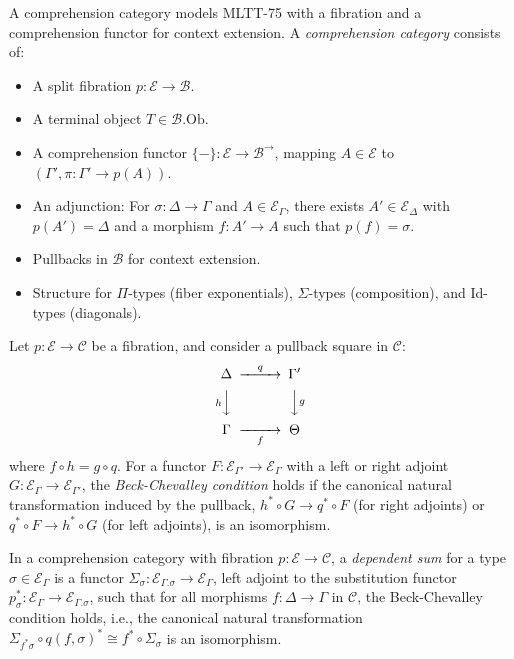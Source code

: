 \documentclass{article}
\begin{document}
\begin{definition}
A comprehension category models MLTT-75 with a fibration and a comprehension functor for context extension.
A \emph{comprehension category} consists of:
\begin{itemize}
  \item A split fibration $p : \mathcal{E} \to \mathcal{B}$.
  \item A terminal object $T \in \mathcal{B}.\text{Ob}$.
  \item A comprehension functor $\{-\} : \mathcal{E} \to \mathcal{B}^\to$, mapping $A \in \mathcal{E}$ to $(\Gamma', \pi : \Gamma' \to p(A))$.
  \item An adjunction: For $\sigma : \Delta \to \Gamma$ and $A \in \mathcal{E}_\Gamma$, there exists $A' \in \mathcal{E}_\Delta$ with $p(A') = \Delta$ and a morphism $f : A' \to A$ such that $p(f) = \sigma$.
  \item Pullbacks in $\mathcal{B}$ for context extension.
  \item Structure for $\Pi$-types (fiber exponentials), $\Sigma$-types (composition), and Id-types (diagonals).
\end{itemize}
\end{definition}

\begin{definition}
Let \(p : \mathcal{E} \to \mathcal{C}\) be a fibration, and consider a pullback square in \(\mathcal{C}\):
\[
\begin{CD}
\Delta @>q>> \Gamma' \\
@V h VV @VV g V \\
\Gamma @>>f> \Theta
\end{CD}
\]
where \(f \circ h = g \circ q\). For a functor \(F : \mathcal{E}_{\Gamma'} \to \mathcal{E}_\Gamma\) with a left or right adjoint \(G : \mathcal{E}_\Gamma \to \mathcal{E}_{\Gamma'}\), the \emph{Beck-Chevalley condition} holds if the canonical natural transformation induced by the pullback, \(h^* \circ G \to q^* \circ F\) (for right adjoints) or \(q^* \circ F \to h^* \circ G\) (for left adjoints), is an isomorphism.
\end{definition}

\newpage



\begin{definition}
In a comprehension category with
fibration \(p : \mathcal{E} \to \mathcal{C}\), a \emph{dependent sum} for
a type \(\sigma \in \mathcal{E}_\Gamma\) is
a functor \(\Sigma_\sigma : \mathcal{E}_{\Gamma.\sigma} \to \mathcal{E}_\Gamma\),
left adjoint to the substitution functor
\(p_\sigma^* : \mathcal{E}_\Gamma \to \mathcal{E}_{\Gamma.\sigma}\), such that for all morphisms \(f : \Delta \to \Gamma\) in \(\mathcal{C}\), the Beck-Chevalley condition holds, i.e., the canonical natural transformation \(\Sigma_{f^*\sigma} \circ q(f, \sigma)^* \cong f^* \circ \Sigma_\sigma\) is an isomorphism.
\end{definition}
\end{document}
